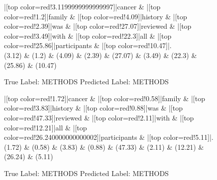\documentclass[a4paper, landscape]{article}
\begin{document}
\begin{figure}
\begin{center}
\begin{dependency}
\begin{deptext}
|[top color=red!3.1199999999999997]|cancer \& |[top color=red!1.2]|family \& |[top color=red!4.09]|history \& |[top color=red!2.39]|was \& |[top color=red!27.07]|reviewed \& |[top color=red!3.49]|with \& |[top color=red!22.3]|all \& |[top color=red!25.86]|participants \& |[top color=red!10.47]|.\\
(3.12) \& (1.2) \& (4.09) \& (2.39) \& (27.07) \& (3.49) \& (22.3) \& (25.86) \& (10.47)\\
\end{deptext}
\end{dependency}
\end{center}
\caption{True Label: METHODS Predicted Label: METHODS}
\end{figure}
\clearpage
\begin{figure}
\begin{center}
\begin{dependency}
\begin{deptext}
|[top color=red!1.72]|cancer \& |[top color=red!0.58]|family \& |[top color=red!3.83]|history \& |[top color=red!0.88]|was \& |[top color=red!47.33]|reviewed \& |[top color=red!2.11]|with \& |[top color=red!12.21]|all \& |[top color=red!26.240000000000002]|participants \& |[top color=red!5.11]|.\\
(1.72) \& (0.58) \& (3.83) \& (0.88) \& (47.33) \& (2.11) \& (12.21) \& (26.24) \& (5.11)\\
\end{deptext}
\end{dependency}
\end{center}
\caption{True Label: METHODS Predicted Label: METHODS}
\end{figure}
\end{document}
